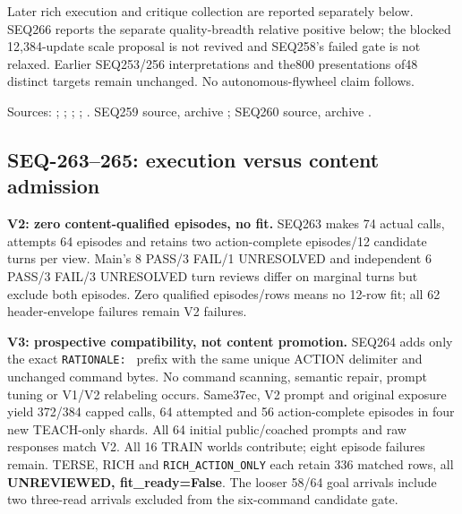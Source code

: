 \documentclass[11pt]{article}
\begin{document}
Later rich execution and critique collection are reported separately below.
SEQ266 reports the separate quality-breadth relative positive below; the blocked 12,384-update
scale proposal is not revived and SEQ258's failed gate is not relaxed.
Earlier SEQ253/256 interpretations and the800 presentations of48 distinct targets
remain unchanged. No autonomous-flywheel claim follows.

Sources: ;
;
;
;
.
SEQ259 source, archive
;
SEQ260 source, archive
.

\subsection{SEQ-263--265: execution versus content admission}
\label{sec:rich-execution-content}

\textbf{V2: zero content-qualified episodes, no fit.} SEQ263 makes 74 actual calls,
attempts 64 episodes and retains two action-complete episodes/12 candidate
turns per view. Main's 8 PASS/3 FAIL/1 UNRESOLVED and independent
6 PASS/3 FAIL/3 UNRESOLVED turn reviews differ on marginal turns but exclude
both episodes. Zero qualified episodes/rows means no 12-row fit; all 62
header-envelope failures remain V2 failures.

\textbf{V3: prospective compatibility, not content promotion.} SEQ264 adds only the
exact \texttt{RATIONALE: } prefix with the same unique ACTION delimiter and unchanged
command bytes. No command scanning, semantic repair, prompt tuning or V1/V2
relabeling occurs. Same37ec, V2 prompt and original exposure yield 372/384
capped calls, 64 attempted and 56 action-complete episodes in four new TEACH-only
shards. All 64 initial public/coached prompts and raw responses match V2.
All 16 TRAIN worlds contribute; eight episode failures remain. TERSE, RICH
and \texttt{RICH\_ACTION\_ONLY} each retain 336 matched rows, all \textbf{UNREVIEWED,
fit\_ready=False}. The looser 58/64 goal arrivals include two three-read
arrivals excluded from the six-command candidate gate.
\end{document}
